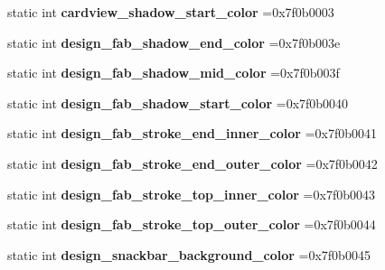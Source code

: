 \begin{DoxyCompactItemize}
static int {\bfseries cardview\+\_\+shadow\+\_\+start\+\_\+color} =0x7f0b0003
\item 
\mbox{\label{classandroid_1_1support_1_1v4_1_1R_1_1color_a58dfde82910b74860ac8debae58ea224}} 
static int {\bfseries design\+\_\+fab\+\_\+shadow\+\_\+end\+\_\+color} =0x7f0b003e
\item 
\mbox{\label{classandroid_1_1support_1_1v4_1_1R_1_1color_a9f4d28dc6c600cde1098fa747e7dcad3}} 
static int {\bfseries design\+\_\+fab\+\_\+shadow\+\_\+mid\+\_\+color} =0x7f0b003f
\item 
\mbox{\label{classandroid_1_1support_1_1v4_1_1R_1_1color_ad1531f269bd65c8886d758d28320165b}} 
static int {\bfseries design\+\_\+fab\+\_\+shadow\+\_\+start\+\_\+color} =0x7f0b0040
\item 
\mbox{\label{classandroid_1_1support_1_1v4_1_1R_1_1color_a4f3b761286a8ea27c07c72876cda7b93}} 
static int {\bfseries design\+\_\+fab\+\_\+stroke\+\_\+end\+\_\+inner\+\_\+color} =0x7f0b0041
\item 
\mbox{\label{classandroid_1_1support_1_1v4_1_1R_1_1color_a5360815ff09d37a68f01b931842d644f}} 
static int {\bfseries design\+\_\+fab\+\_\+stroke\+\_\+end\+\_\+outer\+\_\+color} =0x7f0b0042
\item 
\mbox{\label{classandroid_1_1support_1_1v4_1_1R_1_1color_a6827c42df4660e53eb3831126b991ad1}} 
static int {\bfseries design\+\_\+fab\+\_\+stroke\+\_\+top\+\_\+inner\+\_\+color} =0x7f0b0043
\item 
\mbox{\label{classandroid_1_1support_1_1v4_1_1R_1_1color_a51fc66aa48979295f6fbd9fae6e88339}} 
static int {\bfseries design\+\_\+fab\+\_\+stroke\+\_\+top\+\_\+outer\+\_\+color} =0x7f0b0044
\item 
\mbox{\label{classandroid_1_1support_1_1v4_1_1R_1_1color_a6558218e3654e067c17bff12b9ac5009}} 
static int {\bfseries design\+\_\+snackbar\+\_\+background\+\_\+color} =0x7f0b0045

\end{DoxyCompactItemize}
